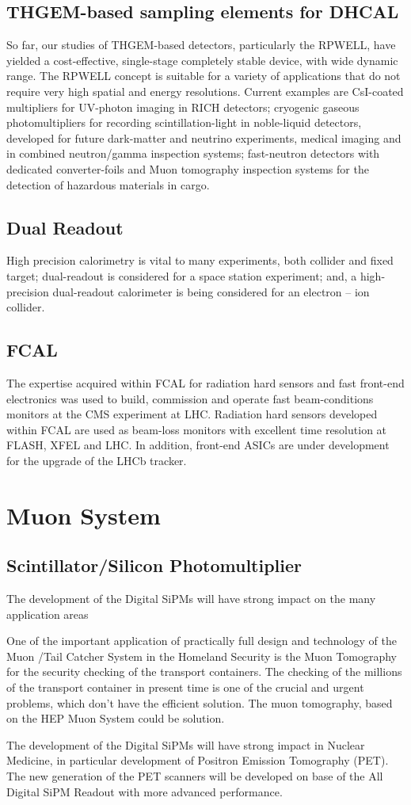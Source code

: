 \subsection{THGEM-based sampling elements for DHCAL}
So far, our studies of THGEM-based detectors, particularly the RPWELL, have yielded a cost-effective, single-stage completely stable device, with wide dynamic range. The RPWELL concept is suitable for a variety of applications that do not require very high spatial and energy resolutions. Current examples are CsI-coated multipliers for UV-photon imaging in RICH detectors; cryogenic gaseous photomultipliers for recording scintillation-light in noble-liquid detectors, developed for future dark-matter and neutrino experiments, medical imaging and in combined neutron/gamma inspection systems; fast-neutron detectors with dedicated converter-foils and Muon tomography inspection systems for the detection of hazardous materials in cargo.

\subsection{Dual Readout}
High precision calorimetry is vital to many experiments, both collider and fixed target; dual-readout is considered for a space station experiment; and, a high-precision dual-readout calorimeter is being considered for an electron -- ion collider.

\subsection{FCAL}
The expertise acquired within FCAL for radiation hard sensors and fast front-end electronics was
used to build, commission and operate fast
beam-conditions monitors at the CMS experiment at LHC.
Radiation hard sensors developed within FCAL are used as beam-loss monitors
with excellent time resolution at FLASH, XFEL and LHC.
In addition, front-end ASICs are under development for the upgrade of the LHCb tracker.

\section{Muon System}
\subsection{Scintillator/Silicon Photomultiplier}
The development of the Digital SiPMs will have strong impact on the many application areas

One of the important application of practically full design and technology of the Muon /Tail Catcher System in the Homeland Security is the Muon Tomography for the security checking of the transport containers. The checking of the millions of the transport container in present time is one of the crucial and urgent problems, which don't have the efficient solution. The muon tomography, based on the HEP Muon System could be solution.

The development of the Digital SiPMs will have strong impact in Nuclear Medicine, in particular development of  Positron Emission Tomography (PET).  The new generation of the PET scanners will be developed on base of the All Digital SiPM Readout with more advanced performance.
